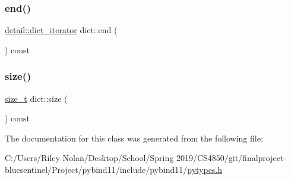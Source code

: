 \mbox{\label{classdict_ade49fb36897f05ec11bf639bc76a2383}} 
\subsubsection{\texorpdfstring{end()}{end()}}
{\footnotesize\ttfamily \mbox{\hyperlink{pytypes_8h_a3c02b3eee4eaa3b690bcdb0405242079}{detail\+::dict\+\_\+iterator}} dict\+::end (\begin{DoxyParamCaption}{ }\end{DoxyParamCaption}) const\hspace{0.3cm}{\ttfamily [inline]}}

\mbox{\label{classdict_a9be291f1c7d50a4ea786626593b8bee3}} 
\subsubsection{\texorpdfstring{size()}{size()}}
{\footnotesize\ttfamily \mbox{\hyperlink{detail_2common_8h_a801d6a451a01953ef8cbae6feb6a3638}{size\+\_\+t}} dict\+::size (\begin{DoxyParamCaption}{ }\end{DoxyParamCaption}) const\hspace{0.3cm}{\ttfamily [inline]}}



The documentation for this class was generated from the following file\+:\begin{DoxyCompactItemize}
\item 
C\+:/\+Users/\+Riley Nolan/\+Desktop/\+School/\+Spring 2019/\+C\+S4850/git/finalproject-\/bluesentinel/\+Project/pybind11/include/pybind11/\mbox{\hyperlink{pytypes_8h}{pytypes.\+h}}\end{DoxyCompactItemize}

